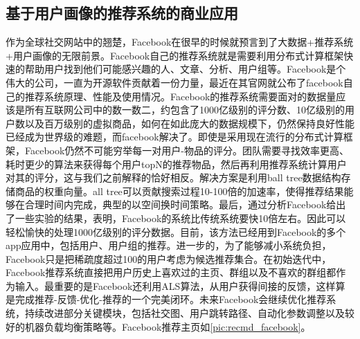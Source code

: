 		\subsection{基于用户画像的推荐系统的商业应用}
		\begin{figure}
	    \centering
	      \label{pic:recmd_facebook}
	    \end{figure}
		作为全球社交网站中的翘楚，Facebook在很早的时候就预言到了大数据+推荐系统+用户画像的无限前景。Facebook自己的推荐系统就是需要利用分布式计算框架快速的帮助用户找到他们可能感兴趣的人、文章、分析、用户组等。Facebook是个伟大的公司，一直为开源软件贡献着一份力量，最近在其官网就公布了facebook自己的推荐系统原理、性能及使用情况\citep{recmd-facebook}。Facebook的推荐系统需要面对的数据量应该是所有互联网公司中的数一数二，约包含了1000亿级别的评分数、10亿级别的用户数以及百万级别的虚拟商品，如何在如此庞大的数据规模下，仍然保持良好性能已经成为世界级的难题，而facebook解决了。即使是采用现在流行的分布式计算框架，Facebook仍然不可能穷举每一对用户-物品的评分。团队需要寻找效率更高、耗时更少的算法来获得每个用户topN的推荐物品，然后再利用推荐系统计算用户对其的评分，这与我们之前解释的恰好相反。解决方案是利用ball tree数据结构存储商品的权重向量。all tree可以贡献搜索过程10-100倍的加速率，使得推荐结果能够在合理时间内完成，典型的以空间换时间策略。最后，通过分析Facebook给出了一些实验的结果，表明，Facebook的系统比传统系统要快10倍左右。因此可以轻松愉快的处理1000亿级别的评分数据。目前，该方法已经用到Facebook的多个app应用中，包括用户、用户组的推荐。进一步的，为了能够减小系统负担，Facebook只是把稀疏度超过100的用户考虑为候选推荐集合。在初始迭代中，Facebook推荐系统直接把用户历史上喜欢过的主页、群组以及不喜欢的群组都作为输入。最重要的是Facebook还利用ALS算法，从用户获得间接的反馈，这样算是完成推荐-反馈-优化-推荐的一个完美闭环。未来Facebook会继续优化推荐系统，持续改进部分关键模块，包括社交图、用户跳转路径、自动化参数调整以及较好的机器负载均衡策略等。Facebook推荐主页如\autoref{pic:recmd_facebook}。
		
